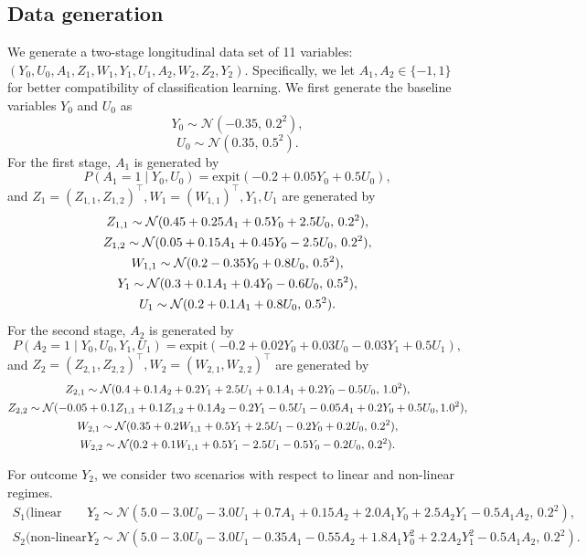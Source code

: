 \documentclass[10pt]{article}
\theoremstyle{remark} \newtheorem{rem}{Remark}
\begin{document}
\subsection{Data generation}
We generate a two-stage longitudinal data set of 11 variables: 
$(Y_0, U_0, A_1, Z_1, W_1, Y_1, U_1, A_2, W_2, Z_2, Y_2)$. 
Specifically, we let $A_1,A_2 \in \{-1,1\}$ for better compatibility of classification learning.
We first generate the baseline variables $Y_0$ and $U_0$ as
$$Y_0 \sim \mathcal{N}(-0.35, \, 0.2^2),$$
$$U_0 \sim \mathcal{N}(0.35, \, 0.5^2).$$
For the first stage, $A_1$ is generated by 
$$P(A_1 = 1 \mid Y_0, U_0) = \text{expit}(-0.2 + 0.05 Y_0 + 0.5 U_0),$$
and $Z_1=(Z_{1,1},Z_{1,2})^\top, W_1=(W_{1,1})^\top,Y_1,U_1$ are generated by 
\begin{gather}
    Z_{1,1} \sim \mathcal{N}(0.45 + 0.25 A_1 + 0.5 Y_0 + 2.5 U_0, \, 0.2^2), \notag\\
    Z_{1,2} \sim \mathcal{N}(0.05 + 0.15 A_1 + 0.45 Y_0 - 2.5 U_0, \, 0.2^2), \notag\\
    W_{1,1} \sim \mathcal{N}(0.2 - 0.35 Y_0 + 0.8 U_0, \, 0.5^2), \notag\\
    Y_1 \sim \mathcal{N}(0.3 + 0.1 A_1 + 0.4 Y_0 - 0.6 U_0, \, 0.5^2), \notag\\
    U_1 \sim \mathcal{N}(0.2 + 0.1 A_1 + 0.8 U_0, \, 0.5^2). \notag
\end{gather}
For the second stage, $A_2$ is generated by
$$P(A_2 = 1 \mid Y_0, U_0, Y_1, U_1) = \text{expit}(-0.2 + 0.02 Y_0 + 0.03 U_0 - 0.03 Y_1 + 0.5 U_1),$$
and $Z_2=(Z_{2,1},Z_{2,2})^\top, W_2=(W_{2,1},W_{2,2})^\top$ are generated by
\begin{gather}
    Z_{2,1} \sim \mathcal{N}(0.4 + 0.1 A_2 + 0.2 Y_1 + 2.5 U_1 + 0.1 A_1 + 0.2 Y_0 - 0.5 U_0, \, 1.0^2), \notag\\
    Z_{2,2} \sim \mathcal{N}(-0.05 + 0.1 Z_{1,1} + 0.1 Z_{1,2} + 0.1 A_2 - 0.2 Y_1 - 0.5 U_1 - 0.05 A_1 + 0.2 Y_0 + 0.5 U_0, 1.0^2), \notag\\
    W_{2,1} \sim \mathcal{N}(0.35 + 0.2 W_{1,1} + 0.5 Y_1 + 2.5 U_1 - 0.2 Y_0 + 0.2 U_0, \, 0.2^2),\notag\\
    W_{2,2} \sim \mathcal{N}(0.2 + 0.1 W_{1,1} + 0.5 Y_1 - 2.5 U_1 - 0.5 Y_0 - 0.2 U_0, \, 0.2^2).\notag
\end{gather}

For outcome $Y_2$, we consider two scenarios with respect to linear and non-linear regimes.
\begin{align*}
    S_1\text{(linear regime)}:\;
    &Y_2 \sim \mathcal{N}(5.0 - 3.0 U_0 - 3.0 U_1 + 0.7 A_1 + 0.15 A_2 + 2.0 A_1 Y_0 + 2.5 A_2 Y_1 - 0.5 A_1 A_2, \, 0.2^2), \\
    S_2\text{(non-linear regime)}:\;
    &Y_2 \sim \mathcal{N}(5.0 - 3.0 U_0 - 3.0 U_1 - 0.35 A_1 - 0.55 A_2 + 1.8 A_1 Y_0^2 + 2.2 A_2 Y_1^2 - 0.5 A_1 A_2, \, 0.2^2).
\end{align*}
\end{document}
